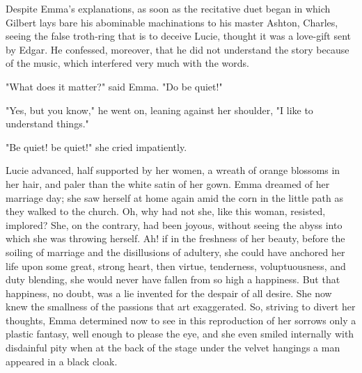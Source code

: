 \documentclass{tufte-book}
\begin{document}
Despite Emma's explanations, as soon as the recitative duet began
in which Gilbert lays bare his abominable machinations to his master
Ashton, Charles, seeing the false troth-ring that is to deceive Lucie,
thought it was a love-gift sent by Edgar. He confessed, moreover, that
he did not understand the story because of the music, which interfered
very much with the words.

"What does it matter?" said Emma. "Do be quiet!"

"Yes, but you know," he went on, leaning against her shoulder, "I like
to understand things."

"Be quiet! be quiet!" she cried impatiently.

Lucie advanced, half supported by her women, a wreath of orange blossoms
in her hair, and paler than the white satin of her gown. Emma dreamed
of her marriage day; she saw herself at home again amid the corn in the
little path as they walked to the church. Oh, why had not she, like
this woman, resisted, implored? She, on the contrary, had been joyous,
without seeing the abyss into which she was throwing herself. Ah! if
in the freshness of her beauty, before the soiling of marriage and the
disillusions of adultery, she could have anchored her life upon some
great, strong heart, then virtue, tenderness, voluptuousness, and duty
blending, she would never have fallen from so high a happiness. But that
happiness, no doubt, was a lie invented for the despair of all desire.
She now knew the smallness of the passions that art exaggerated. So,
striving to divert her thoughts, Emma determined now to see in this
reproduction of her sorrows only a plastic fantasy, well enough to
please the eye, and she even smiled internally with disdainful pity when
at the back of the stage under the velvet hangings a man appeared in a
black cloak.
\end{document}
